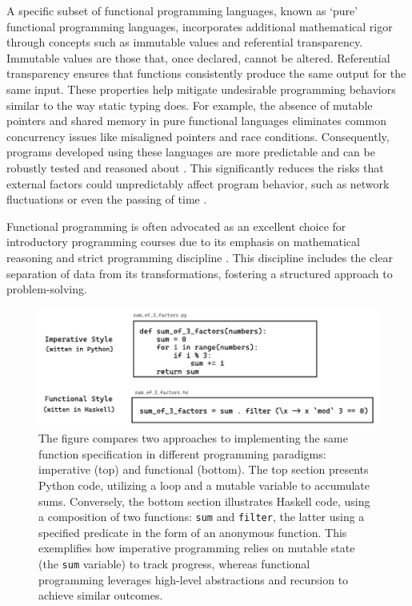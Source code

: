  A specific subset of functional programming languages, known as `pure' functional programming languages, incorporates additional mathematical rigor through concepts such as immutable values and referential transparency. Immutable values are those that, once declared, cannot be altered. Referential transparency ensures that functions consistently produce the same output for the same input. These properties help mitigate undesirable programming behaviors similar to the way static typing does. For example, the absence of mutable pointers and shared memory in pure functional languages eliminates common concurrency issues like misaligned pointers and race conditions. Consequently, programs developed using these languages are more predictable and can be robustly tested and reasoned about \cite{Hu2015-ch}. This significantly reduces the risks that external factors could unpredictably affect program behavior, such as network fluctuations or even the passing of time \cite{Suzuki2019-bi}.

Functional programming is often advocated as an excellent choice for introductory programming courses due to its emphasis on mathematical reasoning and strict programming discipline \cite{Joosten1993-be, Chakravarty2004-ux}. This discipline includes the clear separation of data from its transformations, fostering a structured approach to problem-solving.


\begin{figure}[hbt]
  \includegraphics[width=\linewidth]{ImperativeFunctional}
  \caption{
    \label{fig:imperative-vs-functional}
    The figure compares two approaches to implementing the same function specification in different programming paradigms: imperative (top) and functional (bottom). The top section presents Python code, utilizing a loop and a mutable variable to accumulate sums. Conversely, the bottom section illustrates Haskell code, using a composition of two functions: \texttt{sum} and \texttt{filter}, the latter using a specified predicate in the form of an anonymous function. This exemplifies how imperative programming relies on mutable state (the \texttt{sum} variable) to track progress, whereas functional programming leverages high-level abstractions and recursion to achieve similar outcomes.    
    }
\end{figure}


